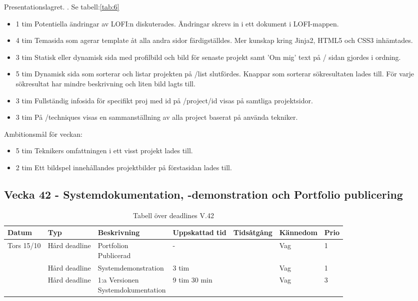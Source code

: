 \documentclass{TDP003mall}
\begin{document}
Presentationslagret. . Se tabell:\ref{tab:6}
\begin{itemize}
  \item 1 tim Potentiella ändringar av LOFI:n diskuterades. Ändringar skrevs in i ett dokument i LOFI-mappen.
  \item 4 tim Temasida som agerar template åt alla andra sidor färdigställdes. Mer kunskap kring Jinja2, HTML5 och CSS3 inhämtades.
  \item 3 tim Statisk eller dynamisk sida med profilbild och bild för senaste projekt samt 'Om mig' text på / sidan gjordes i ordning.
  \item 5 tim Dynamisk sida som sorterar och listar projekten på /list slutfördes. Knappar som sorterar sökresultaten lades till. För varje sökresultat har mindre beskrivning och liten bild lagts till.                  
  \item 3 tim Fullständig infosida för specifikt proj med id på /project/id visas på samtliga projektsidor.
  \item 3 tim På /techniques visas en sammanställning av alla project baserat på använda tekniker.
\end{itemize}

Ambitionsmål för veckan:
\begin{itemize}
\item 5 tim Teknikers omfattningen i ett visst projekt lades till.
\item 2 tim Ett bildspel innehållandes projektbilder på förstasidan lades till.
\end{itemize}

\subsection*{Vecka 42 - Systemdokumentation, -demonstration och Portfolio publicering}
\begin{table}[h!]
  \label{tab:7}
\begin{tabularx}{\linewidth}{|l|l|X|l|l|l|l|}
  \hline
  Datum            & Typ           & Beskrivning                                         & Uppskattad tid & Tidsåtgång & Kännedom & Prio \\ [0.5ex]
  \hline                                             
        Tors 15/10 & Hård deadline & \makecell[tl]{Portfolion\\ Publicerad}              & -              &            & Vag      & 1 \\ \hline
                   & Hård deadline & Systemdemonstration                                 & 3 tim          &            & Vag      & 1    \\
  \hline                                             
                   & Hård deadline & \makecell[tl]{1:a Versionen \\ Systemdokumentation} & 9 tim 30 min   &            & Vag      & 3 \\
  \hline
\end{tabularx}
      \caption{Tabell över deadlines V.42}
    \end{table}
    
\end{document}
